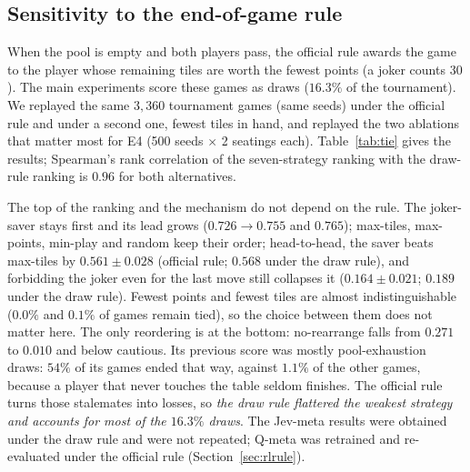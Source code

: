 \documentclass[11pt]{article}
\begin{document}
\subsection{Sensitivity to the end-of-game rule}\label{sec:tie}
When the pool is empty and both players pass, the official rule awards the game to the player whose remaining tiles are worth the fewest points (a joker counts $30$). The main experiments score these games as draws ($16.3\%$ of the tournament). We replayed the same $3{,}360$ tournament games (same seeds) under the official rule and under a second one, fewest tiles in hand, and replayed the two ablations that matter most for E4 (500 seeds $\times$ 2 seatings each). Table~\ref{tab:tie} gives the results; Spearman's rank correlation of the seven-strategy ranking with the draw-rule ranking is $0.96$ for both alternatives.
\begin{table}[h]\centering\small
\caption{Tournament score (95\% CI) under three end-of-game rules. The last two rows are mechanism ablations against max-tiles. Fewest points is the official rule.}\label{tab:tie}

\end{table}
The top of the ranking and the mechanism do not depend on the rule. The joker-saver stays first and its lead grows ($0.726\to0.755$ and $0.765$); max-tiles, max-points, min-play and random keep their order; head-to-head, the saver beats max-tiles by $0.561\pm0.028$ (official rule; $0.568$ under the draw rule), and forbidding the joker even for the last move still collapses it ($0.164\pm0.021$; $0.189$ under the draw rule). Fewest points and fewest tiles are almost indistinguishable ($0.0\%$ and $0.1\%$ of games remain tied), so the choice between them does not matter here. The only reordering is at the bottom: no-rearrange falls from $0.271$ to $0.010$ and below cautious. Its previous score was mostly pool-exhaustion draws: $54\%$ of its games ended that way, against $1.1\%$ of the other games, because a player that never touches the table seldom finishes. The official rule turns those stalemates into losses, so \emph{the draw rule flattered the weakest strategy and accounts for most of the $16.3\%$ draws}. The Jev-meta results were obtained under the draw rule and were not repeated; Q-meta was retrained and re-evaluated under the official rule (Section~\ref{sec:rlrule}).
\end{document}
